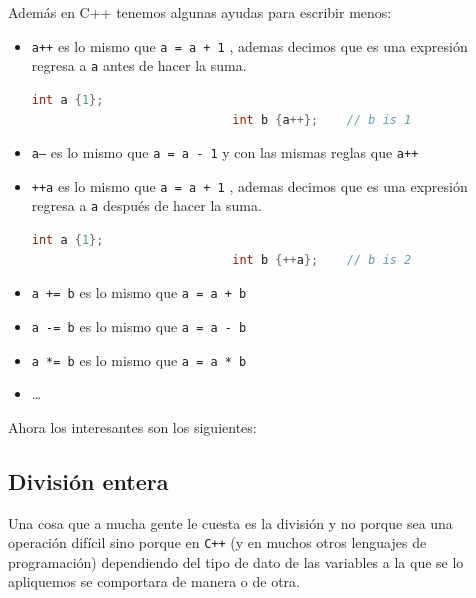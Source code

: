 \documentclass[12pt, fleqn]{report}                             %
\theoremstyle{break}                                            %
\newcommand{\textCode}[1]  { \texttt{#1} }                      %
\newcommand{\Cpp}{\ignorespaces\textCode{C++}}                  %
\begin{document}
                Además en C++ tenemos algunas ayudas para escribir menos:
                \begin{itemize}
                    \item \textCode{a++} es lo mismo que \textCode{a = a + 1}, ademas 
                        decimos que es una expresión regresa a \textCode{a} antes de hacer la suma.
                        \begin{lstlisting}[language=C++, gobble=28]
                            int a {1};
                            int b {a++};    // b is 1
                        \end{lstlisting}
                    \item \textCode{a---} es lo mismo que \textCode{a = a - 1} y con las mismas reglas que \textCode{a++}
                    \item \textCode{++a} es lo mismo que \textCode{a = a + 1}, ademas 
                        decimos que es una expresión regresa a \textCode{a} después de hacer la suma.
                        \begin{lstlisting}[language=C++, gobble=28]
                            int a {1};
                            int b {++a};    // b is 2
                        \end{lstlisting}
                    \item \textCode{a += b} es lo mismo que \textCode{a = a + b}
                    \item \textCode{a -= b} es lo mismo que \textCode{a = a - b}
                    \item \textCode{a *= b} es lo mismo que \textCode{a = a * b}
                    \item \dots
                \end{itemize}

                Ahora los interesantes son los siguientes:

            \clearpage
            \subsection{División entera}

                Una cosa que a mucha gente le cuesta es la división y no porque
                sea una operación difícil sino porque en \Cpp (y en muchos otros lenguajes de programación)
                dependiendo del tipo de dato de las variables a la que se lo  apliquemos se comportara 
                de manera o de otra.
\end{document}

